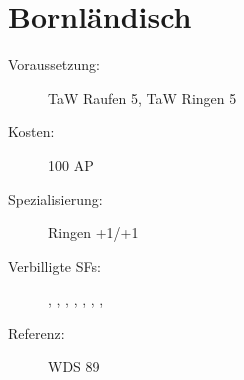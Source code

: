 \section{Bornländisch}
\label{uSpez.bornlaendisch}
\begin{description}
    \item[Voraussetzung:]
        TaW Raufen 5, TaW Ringen 5
    \item[Kosten:]
        100 AP
    \item[Spezialisierung:]
        Ringen +1/+1
    \item[Verbilligte SFs:]
        , , , , , , , 
    \item [Referenz:]
        WDS 89
\end{description}

